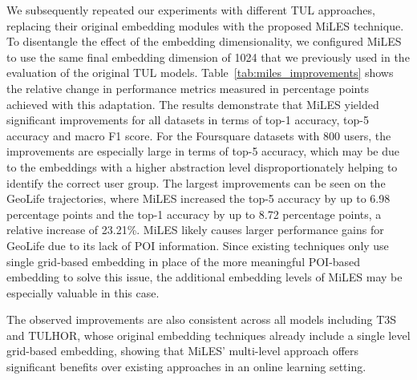 \documentclass{article} %
\theoremstyle{definition}
\begin{document}
We subsequently repeated our experiments with different TUL approaches, replacing their original embedding modules with the proposed MiLES technique.
To disentangle the effect of the embedding dimensionality, we configured MiLES to use the same final embedding dimension of 1024 that we previously used in the evaluation of the original TUL models.
Table~\ref{tab:miles_improvements} shows the relative change in performance metrics measured in percentage points achieved with this adaptation.
The results demonstrate that MiLES yielded significant improvements for all datasets in terms of top-1 accuracy, top-5 accuracy and macro F1 score.
For the Foursquare datasets with 800 users, the improvements are especially large in terms of top-5 accuracy, which may be due to the embeddings with a higher abstraction level disproportionately helping to identify the correct user group.
The largest improvements can be seen on the GeoLife trajectories, where MiLES increased the top-5 accuracy by up to 6.98 percentage points and the top-1 accuracy by up to 8.72 percentage points, a relative increase of 23.21\%.
MiLES likely causes larger performance gains for GeoLife due to its lack of POI information.
Since existing techniques only use single grid-based embedding in place of the more meaningful POI-based embedding \citep{yangT3SEffectiveRepresentation2021} to solve this issue, the additional embedding levels of MiLES may be especially valuable in this case.

The observed improvements are also consistent across all models including T3S and TULHOR, whose original embedding techniques already include a single level grid-based embedding, showing that MiLES' multi-level approach offers significant benefits over existing approaches in an online learning setting.
\end{document}
